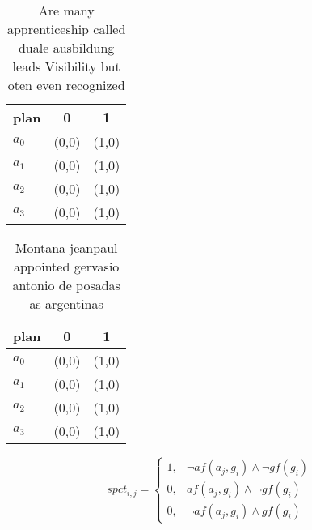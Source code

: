 \documentclass[a4paper]{article}
\begin{document}
\begin{table}
\begin{adjustbox}{width=1\columnwidth}
\begin{tabular}{|l|l|l|}
\hline
\textbf{plan} & \multicolumn{1}{c|}{\textbf{0}} & \multicolumn{1}{c|}{\textbf{1}} \\ \hline
\textbf{$a_0$}  & (0,0) & (1,0) \\ \hline
\textbf{$a_1$}  & (0,0) & (1,0) \\ \hline
\textbf{$a_2$}  & (0,0) & (1,0) \\ \hline
\textbf{$a_3$}  & (0,0) & (1,0) \\ \hline
\end{tabular}
\end{adjustbox}
\caption{Are many apprenticeship called duale ausbildung leads Visibility but oten even recognized
}
\end{table}

\begin{table}
\begin{adjustbox}{width=1\columnwidth}
\begin{tabular}{|l|l|l|}
\hline
\textbf{plan} & \multicolumn{1}{c|}{\textbf{0}} & \multicolumn{1}{c|}{\textbf{1}} \\ \hline
\textbf{$a_0$}  & (0,0) & (1,0) \\ \hline
\textbf{$a_1$}  & (0,0) & (1,0) \\ \hline
\textbf{$a_2$}  & (0,0) & (1,0) \\ \hline
\textbf{$a_3$}  & (0,0) & (1,0) \\ \hline
\end{tabular}
\end{adjustbox}
\caption{Montana jeanpaul appointed gervasio antonio de posadas as argentinas 
}
\end{table}

\begin{equation}
spct_{i,j} =
\begin{cases}
1, & \text{$\neg af(a_j,g_i) \wedge \neg gf(g_i)$}\\
0, & \text{$af(a_j,g_i) \wedge \neg gf(g_i)$}\\
0, & \text{$\neg af(a_j,g_i) \wedge gf(g_i)$}
\end{cases}
\end{equation}
\end{document}
